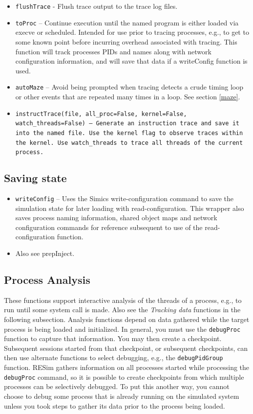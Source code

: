 \documentclass[titlepage]{article}
\begin{document}
\begin{itemize}
\item {\tt flushTrace} - Flush trace output to the trace log files.

\item {\tt toProc} – Continue execution until the named program is either loaded via execve or scheduled.  Intended for use prior to tracing processes, e.g., to get to some known point before incurring overhead associated with tracing.   This function will track processes PIDs and names along with network configuration information, and will save that data if a writeConfig function is used.

\item {\tt autoMaze} -- Avoid being prompted when tracing detects a crude timing loop or other events that are repeated many times in a loop.
See section \ref{maze}.

\item {\tt instructTrace(file, all\_proc=False, kernel=False, watch\_threads=False) -- Generate an instruction trace and save it into the named file. Use the kernel
flag to observe traces within the kernel. Use {\tt watch\_threads} to trace all threads of the current process.}
\end{itemize}


\subsection{Saving state}
\begin{itemize}
\item {\tt writeConfig} – Uses the Simics write-configuration command to save the simulation state for later loading with read-configuration.  This wrapper also saves process naming information, shared object maps and network configuration commands for reference subsequent to use of the read-configuration function.
\item Also see prepInject.
\end{itemize}

\subsection{Process Analysis}
These functions support interactive analysis of the threads of a process, e.g., to run until some system call is made.  Also see the \textit{Tracking data} functions
in the following subsection.  Analysis functions depend on data gathered while the target process is being loaded and initialized.  In general, you
must use the {\tt debugProc} function to capture that information.  You may then create a checkpoint.  Subsequent sessions started from that checkpoint,
or subsequent checkpoints, can then use alternate functions to select debugging, e.g., the {\tt debugPidGroup} function. RESim gathers information on
all processes started while processing the {\tt debugProc} command, so it is possible to create checkpoints from which multiple processes can be selectively
debugged.  To put this another way, you cannot choose to debug some process that is already running on the simulated system unless you took steps to
gather its data prior to the process being loaded.
\end{document}
